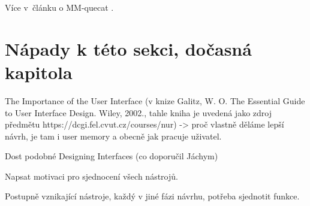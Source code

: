 Více v~článku o MM-quecat \cite{MM_quecat}.


\section{Nápady k této sekci, dočasná kapitola}

The Importance of the User Interface (v knize Galitz, W. O. The Essential Guide to User Interface Design. Wiley, 2002., tahle kniha je uvedená jako zdroj předmětu https://dcgi.fel.cvut.cz/courses/nur) -> proč vlastně děláme lepší návrh, je tam i user memory a obecně jak pracuje uživatel.

Dost podobné Designing Interfaces (co doporučil Jáchym)

Napsat motivaci pro sjednocení všech nástrojů.

Postupně vznikající nástroje, každý v jiné fázi návrhu, potřeba sjednotit funkce. 
